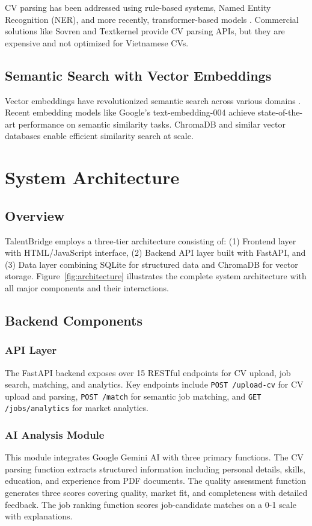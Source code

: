 \documentclass[conference]{IEEEtran}
\begin{document}
CV parsing has been addressed using rule-based systems, Named Entity Recognition (NER), and more recently, transformer-based models \cite{b5}. Commercial solutions like Sovren and Textkernel provide CV parsing APIs, but they are expensive and not optimized for Vietnamese CVs.

\subsection{Semantic Search with Vector Embeddings}

Vector embeddings have revolutionized semantic search across various domains \cite{b6}. Recent embedding models like Google's text-embedding-004 achieve state-of-the-art performance on semantic similarity tasks. ChromaDB and similar vector databases enable efficient similarity search at scale.

\section{System Architecture}

\subsection{Overview}

TalentBridge employs a three-tier architecture consisting of: (1) Frontend layer with HTML/JavaScript interface, (2) Backend API layer built with FastAPI, and (3) Data layer combining SQLite for structured data and ChromaDB for vector storage. Figure~\ref{fig:architecture} illustrates the complete system architecture with all major components and their interactions.

\subsection{Backend Components}

\subsubsection{API Layer}
The FastAPI backend exposes over 15 RESTful endpoints for CV upload, job search, matching, and analytics. Key endpoints include \texttt{POST /upload-cv} for CV upload and parsing, \texttt{POST /match} for semantic job matching, and \texttt{GET /jobs/analytics} for market analytics.

\subsubsection{AI Analysis Module}
This module integrates Google Gemini AI with three primary functions. The CV parsing function extracts structured information including personal details, skills, education, and experience from PDF documents. The quality assessment function generates three scores covering quality, market fit, and completeness with detailed feedback. The job ranking function scores job-candidate matches on a 0-1 scale with explanations.
\end{document}
